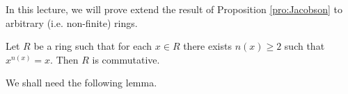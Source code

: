 In this lecture, we will prove extend the 
result of 
Proposition \ref{pro:Jacobson} to arbitrary 
(i.e. non-finite) rings. 

\begin{theorem}[Jacobson]
\label{thm:commutativity}
	Let $R$ be a ring such that 
	for each $x\in R$ there exists $n(x)\geq2$ such that 
	$x^{n(x)}=x$. Then $R$ is commutative. 
\end{theorem}

We shall need the following lemma.








